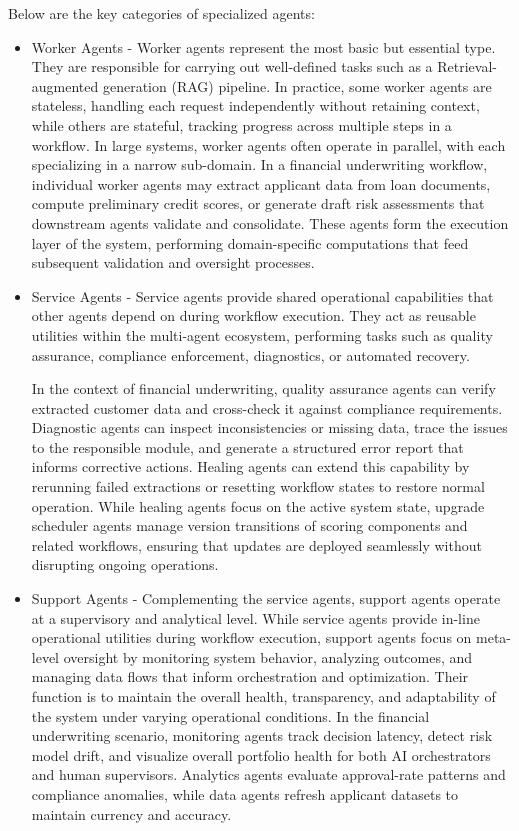 \documentclass[conference]{IEEEtran}
\begin{document}
Below are the key categories of specialized agents:
\begin{itemize}
\item Worker Agents - Worker agents represent the most basic but essential type. They are responsible for carrying out well-defined tasks such as a Retrieval-augmented generation (RAG) pipeline. In practice, some worker agents are stateless, handling each request independently without retaining context, while others are stateful, tracking progress across multiple steps in a workflow. In large systems, worker agents often operate in parallel, with each specializing in a narrow sub-domain. In a financial underwriting workflow, individual worker agents may extract applicant data from loan documents, compute preliminary credit scores, or generate draft risk assessments that downstream agents validate and consolidate. These agents form the execution layer of the system, performing domain-specific computations that feed subsequent validation and oversight processes. 
\item Service Agents - Service agents provide shared operational capabilities that other agents depend on during workflow execution. They act as reusable utilities within the multi-agent ecosystem, performing tasks such as quality assurance, compliance enforcement, diagnostics, or automated recovery.

In the context of financial underwriting,  quality assurance agents can verify extracted customer data and cross-check it against compliance requirements. Diagnostic agents can inspect inconsistencies or missing data, trace the issues to the responsible module, and generate a structured error report that informs corrective actions. Healing agents can extend this capability by rerunning failed extractions or  resetting workflow states to restore normal operation. While healing agents focus on the active system state, upgrade scheduler agents manage version transitions of scoring components and related workflows, ensuring that  updates are deployed seamlessly without disrupting ongoing operations.

\item  Support Agents -  Complementing the service agents, support agents operate at a supervisory and analytical level. While service agents provide in-line operational utilities during workflow execution, support agents focus on meta-level oversight by monitoring system behavior, analyzing outcomes, and managing data flows that inform orchestration and optimization. Their function is to maintain the overall health, transparency, and adaptability of the system under varying operational conditions. In the financial underwriting scenario, monitoring agents track decision latency, detect risk model drift, and visualize overall portfolio health for both AI orchestrators and human supervisors. Analytics agents evaluate approval-rate patterns and compliance anomalies, while data agents refresh applicant datasets to maintain currency and accuracy.


\end{itemize}
\end{document}
